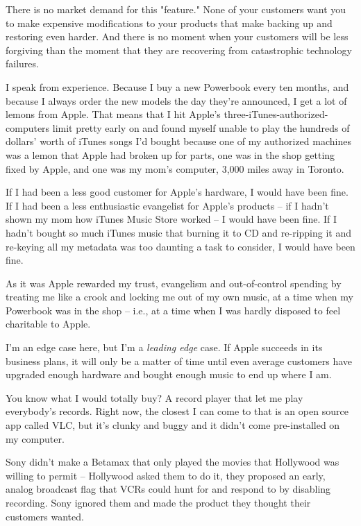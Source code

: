 There is no market demand for this "feature." None of your
customers want you to make expensive modifications to your products
that make backing up and restoring even harder. And there is no
moment when your customers will be less forgiving than the moment
that they are recovering from catastrophic technology failures.

I speak from experience. Because I buy a new Powerbook every ten
months, and because I always order the new models the day they're
announced, I get a lot of lemons from Apple. That means that I hit
Apple's three-iTunes-authorized-computers limit pretty early on and
found myself unable to play the hundreds of dollars' worth of
iTunes songs I'd bought because one of my authorized machines was a
lemon that Apple had broken up for parts, one was in the shop
getting fixed by Apple, and one was my mom's computer, 3,000 miles
away in Toronto.

If I had been a less good customer for Apple's hardware, I would
have been fine. If I had been a less enthusiastic evangelist for
Apple's products -- if I hadn't shown my mom how iTunes Music Store
worked -- I would have been fine. If I hadn't bought so much iTunes
music that burning it to CD and re-ripping it and re-keying all my
metadata was too daunting a task to consider, I would have been
fine.

As it was Apple rewarded my trust, evangelism and out-of-control
spending by treating me like a crook and locking me out of my own
music, at a time when my Powerbook was in the shop -- i.e., at a
time when I was hardly disposed to feel charitable to Apple.

I'm an edge case here, but I'm a \emph{leading edge} case. If
Apple succeeds in its business plans, it will only be a matter of
time until even average customers have upgraded enough hardware and
bought enough music to end up where I am.

You know what I would totally buy? A record player that let me play
everybody's records. Right now, the closest I can come to that is
an open source app called VLC, but it's clunky and buggy and it
didn't come pre-installed on my computer.

Sony didn't make a Betamax that only played the movies that
Hollywood was willing to permit -- Hollywood asked them to do it,
they proposed an early, analog broadcast flag that VCRs could hunt
for and respond to by disabling recording. Sony ignored them and
made the product they thought their customers wanted.

